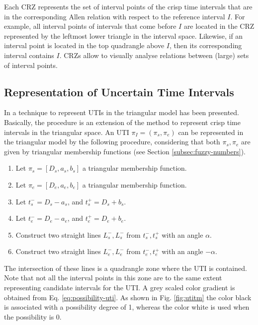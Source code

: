 Each CRZ represents the set of interval points of the crisp time intervals that are in the corresponding Allen relation with respect to the reference interval $I$. For example, all interval points of intervals that come before $I$ are located in the CRZ represented by the leftmost lower triangle in the interval space. Likewise, if an interval point is located in the top quadrangle above $I$, then its corresponding interval contains $I$. CRZs allow to visually analyse relations between (large) sets of interval points.

\subsection{\label{subsec:utis-in-tm}Representation of Uncertain Time Intervals}
In \cite{DeTre2012} a technique to represent UTIs in the triangular model has been presented. Basically, the procedure is an extension of the method to represent crisp time intervals in the triangular space. An UTI $\pi_I = \left(\pi_s, \pi_e \right)$ can be represented in the triangular model by the following procedure, considering that both $\pi_s, \pi_e$ are given by triangular membership functions (see Section \ref{subsec:fuzzy-numbers}).

\begin{enumerate}
 \item Let $\pi_s = \left[D_s, a_s, b_s\right]$ a triangular membership function.
\item Let $\pi_e = \left[D_e, a_e, b_e \right]$ a triangular membership function.
\item Let $t_s^{-} = D_s - a_s$, and $t_s^{+} = D_s + b_s$.
\item Let $t_e^{-} = D_e -a_e$, and $t_e^{+} = D_e + b_e$.
\item Construct two straight lines $L_s^{-}, L_s^{-}$ from $t_s^{-}, t_s^{+}$ with an angle $\alpha$.
\item Construct two straight lines $L_e^{-}, L_e^{-}$ from $t_e^{-}, t_e^{+}$ with an angle $-\alpha$.
\end{enumerate}

The intersection of these lines is a quadrangle zone where the UTI is contained. Note that not all the interval points in this zone are to the same extent representing candidate intervals for the UTI.  A grey scaled color gradient is obtained from Eq. \eqref{eq:possibility-uti}. As shown in Fig. \ref{fig:utitm} the color black is associated with a possibility degree of 1, whereas the color white is used when the possibility is 0.

